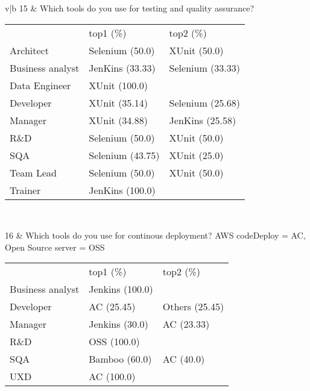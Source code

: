 \begin{table}[htbp]
\begin{tabularx}{\textwidth}{v|b}
        15 & Which tools do you use for testing and quality assurance?
        {
        \begin{tabularx}{0.92\textwidth}{yyy}
         & top1 (\%) & top2 (\%) \\
        Architect & Selenium (50.0)  & XUnit (50.0)  \\
        Business analyst & JenKins (33.33)  & Selenium (33.33)  \\
        Data Engineer & XUnit (100.0)  &  \\
        Developer & XUnit (35.14)  & Selenium (25.68)  \\
        Manager & XUnit (34.88)  & JenKins (25.58)  \\
        R\&D & Selenium (50.0)  & XUnit (50.0)  \\
        SQA & Selenium (43.75)  & XUnit (25.0)  \\
        Team Lead & Selenium (50.0)  & XUnit (50.0)  \\
        Trainer & JenKins (100.0)  &  \\

        \end{tabularx}
        } \\ \hline
        
        16 & Which tools do you use for continous deployment? \newline
        AWS codeDeploy = AC, Open Source server = OSS
        {
        \begin{tabularx}{0.92\textwidth}{yyy}
         & top1 (\%) & top2 (\%) \\
        Business analyst & Jenkins (100.0)  &  \\
        Developer & AC (25.45)  & Others (25.45)  \\
        Manager & Jenkins (30.0)  & AC (23.33)  \\
        R\&D & OSS (100.0)  &  \\
        SQA & Bamboo (60.0)  & AC (40.0)  \\
        UXD & AC (100.0)  &  \\
        \end{tabularx}
        } \\ \hline
    \end{tabularx} 
    \label{table:analysis by profession part3}
\end{table}